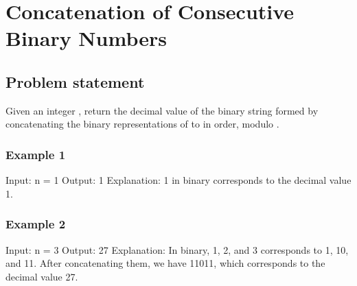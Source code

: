\documentclass[letterpaper,12pt,english]{book}
\begin{document}
\sphinxstepscope


\section{Concatenation of Consecutive Binary Numbers}
\label{\detokenize{Mathematics/09_MTH_1680_Concatenation_of_Consecutive_Binary_Numbers:concatenation-of-consecutive-binary-numbers}}\label{\detokenize{Mathematics/09_MTH_1680_Concatenation_of_Consecutive_Binary_Numbers::doc}}

\subsection{Problem statement\sphinxfootnotemark[114]}
\label{\detokenize{Mathematics/09_MTH_1680_Concatenation_of_Consecutive_Binary_Numbers:problem-statement}}%
\begin{footnotetext}[114]\sphinxAtStartFootnote
{}
%
\end{footnotetext}\ignorespaces 
\sphinxAtStartPar
Given an integer , return the decimal value of the binary string formed by concatenating the binary representations of  to  in order, modulo .


\subsubsection{Example 1}
\label{\detokenize{Mathematics/09_MTH_1680_Concatenation_of_Consecutive_Binary_Numbers:example-1}}
\begin{sphinxVerbatim}[commandchars=\\\{\}]
Input: n = 1
Output: 1
Explanation: \PYGZdq{}1\PYGZdq{} in binary corresponds to the decimal value 1. 
\end{sphinxVerbatim}


\subsubsection{Example 2}
\label{\detokenize{Mathematics/09_MTH_1680_Concatenation_of_Consecutive_Binary_Numbers:example-2}}
\begin{sphinxVerbatim}[commandchars=\\\{\}]
Input: n = 3
Output: 27
Explanation: In binary, 1, 2, and 3 corresponds to \PYGZdq{}1\PYGZdq{}, \PYGZdq{}10\PYGZdq{}, and \PYGZdq{}11\PYGZdq{}.
After concatenating them, we have \PYGZdq{}11011\PYGZdq{}, which corresponds to the decimal value 27.
\end{sphinxVerbatim}
\end{document}
